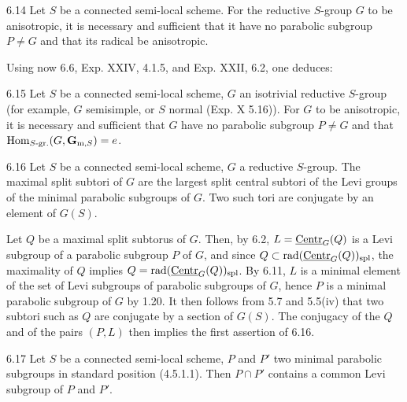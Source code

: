 \begin{corollary}{6.14}\label{XXVI.6.14}
Let $S$ be a connected semi-local scheme. For the reductive $S$-group $G$ to be anisotropic, it is necessary and sufficient that it have no parabolic subgroup $P\neq G$ and that its radical be anisotropic.
\end{corollary}
Using now 6.6, Exp. XXIV, 4.1.5, and Exp. XXII, 6.2, one deduces:

\begin{corollary}{6.15}\label{XXVI.6.15}
Let $S$ be a connected semi-local scheme, $G$ an isotrivial reductive $S$-group (for example, $G$ semisimple, or $S$ normal (Exp. X 5.16)). For $G$ to be anisotropic, it is necessary and sufficient that $G$ have no parabolic subgroup $P\neq G$ and that $\operatorname{Hom}_{S\text{-gr.}}(G,\mathbf{G}_{\mathrm m,S})=e$.
\end{corollary}

\begin{proposition}{6.16}\label{XXVI.6.16}
Let $S$ be a connected semi-local scheme, $G$ a reductive $S$-group. The maximal split subtori of $G$ are the largest split central subtori of the Levi groups of the minimal parabolic subgroups of $G$. Two such tori are conjugate by an element of $G(S)$.
\end{proposition}
Let $Q$ be a maximal split subtorus of $G$. Then, by 6.2, $L=\underline{\mathrm{Centr}}_G(Q)$ is a Levi subgroup of a parabolic subgroup $P$ of $G$, and since $Q\subset\operatorname{rad}(\underline{\mathrm{Centr}}_G(Q))_{\mathrm{spl}}$, the maximality of $Q$ implies $Q=\operatorname{rad}(\underline{\mathrm{Centr}}_G(Q))_{\mathrm{spl}}$. By 6.11, $L$ is a minimal element of the set of Levi subgroups of parabolic subgroups of $G$, hence $P$ is a minimal parabolic subgroup of $G$ by 1.20. It then follows from 5.7 and 5.5(iv) that two subtori such as $Q$ are conjugate by a section of $G(S)$. The conjugacy of the $Q$ and of the pairs $(P,L)$ then implies the first assertion of 6.16.

\begin{corollary}{6.17}\label{XXVI.6.17}
Let $S$ be a connected semi-local scheme, $P$ and $P'$ two minimal parabolic subgroups in standard position (4.5.1.1). Then $P\cap P'$ contains a common Levi subgroup of $P$ and $P'$.
\end{corollary}
